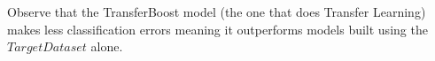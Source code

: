\documentclass[a4paper,12pt, english]{article}
\begin{document}
Observe that the TransferBoost model (the one that does Transfer Learning) makes less classification errors meaning it outperforms models built using the $Target Dataset$ alone.

\end{document}
